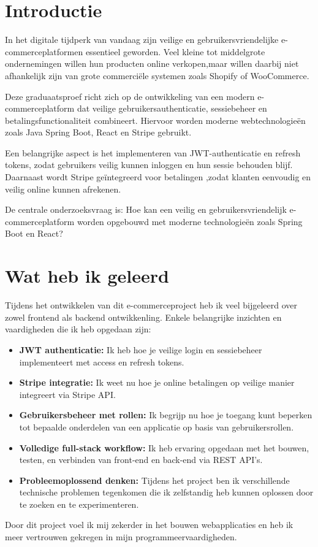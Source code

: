 \documentclass[a0,portrait]{hogent-poster}
\begin{document}
\begin{multicols}{2} %

\section{Introductie}

In het digitale tijdperk van vandaag zijn veilige en gebruikersvriendelijke e-commerceplatformen essentieel geworden. Veel kleine tot middelgrote ondernemingen willen hun producten online verkopen,maar willen daarbij niet afhankelijk zijn van grote commerciële  systemen zoals Shopify of WooCommerce.

Deze graduaatsproef richt zich op de ontwikkeling van een modern e-commerceplatform dat veilige gebruikersauthenticatie, sessiebeheer en betalingsfunctionaliteit combineert. Hiervoor worden moderne webtechnologieën zoals Java Spring Boot, React en Stripe gebruikt.

Een belangrijke aspect is het implementeren van JWT-authenticatie en refresh tokens, zodat gebruikers veilig kunnen inloggen en hun sessie behouden blijf. Daarnaast wordt Stripe geïntegreerd voor betalingen ,zodat klanten eenvoudig en veilig online kunnen afrekenen.

De centrale onderzoeksvraag is:
Hoe kan een veilig en gebruikersvriendelijk e-commerceplatform worden opgebouwd met moderne technologieën zoals Spring Boot en React?

\section{Wat heb ik geleerd}

Tijdens het ontwikkelen van dit e-commerceproject heb ik veel bijgeleerd over zowel frontend als backend ontwikkenling. Enkele belangrijke inzichten en vaardigheden die ik heb opgedaan zijn:


\begin{itemize}
\item \textbf{JWT authenticatie:} Ik heb hoe je veilige login en sessiebeheer implementeert met access en refresh tokens.
\item \textbf{Stripe integratie:} Ik weet nu hoe je online betalingen op veilige manier integreert via Stripe API.
\item \textbf{Gebruikersbeheer met rollen:} Ik begrijp nu hoe je toegang kunt beperken tot bepaalde onderdelen van een applicatie op basis van gebruikersrollen.
\item \textbf{Volledige full-stack workflow:} Ik heb ervaring opgedaan met het bouwen, testen, en verbinden van front-end en back-end via REST API’s.
\item \textbf{Probleemoplossend denken:} Tijdens het project ben ik verschillende technische problemen tegenkomen die ik zelfstandig heb kunnen oplossen door te zoeken en te experimenteren.
\end{itemize}
 Door dit project voel ik mij zekerder in het bouwen webapplicaties en heb ik meer vertrouwen gekregen in mijn programmeervaardigheden.


\end{multicols}
\end{document}
